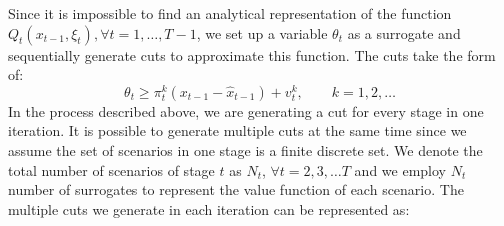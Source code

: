 \documentclass[12pt]{article}
\begin{document}
	Since it is impossible to find an analytical representation of the function \(Q_t(x_{t-1},\xi_t), \forall t = 1, \dots, T-1\), we set up a variable \(\theta_t\)  as a surrogate and sequentially generate cuts to approximate this function. The cuts take the form of:
	\begin{equation}
		\theta_t \geq \pi_t^k(x_{t-1} - \hat{x}_{t-1}) + v_t^k, \qquad k = 1, 2, \dots
	\end{equation}
	In the process described above, we are generating a cut for every stage in one iteration. It is possible to generate multiple cuts at the same time since we assume the set of scenarios in one stage is a finite discrete set. We denote the total number of scenarios of stage \(t\) as \(N_t\), \(\forall t = 2,3, \dots T\) and we employ \(N_t\) number of surrogates to represent the value function of each scenario. The multiple cuts we generate in each iteration can be represented as:
\end{document}
